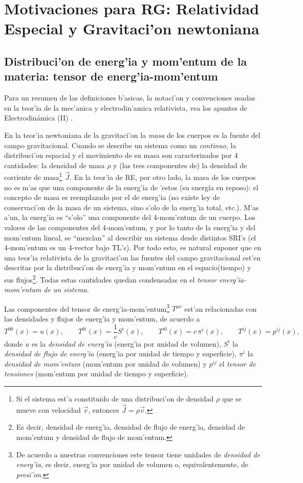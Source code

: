 \chapter{Motivaciones para RG: Relatividad Especial y Gravitaci'on newtoniana}
\section{Distribuci'on de energ'ia y mom'entum de la materia: tensor de energ'ia-mom'entum}

Para un resumen de las definiciones b'asicas, la notaci'on y convenciones usadas en la teor'ia de la mec'anica y electrodin'amica relativista, vea los apuntes de Electrodin\'amica (II) \cite{7}.

En la teor'ia newtoniana de la gravitaci'on la \textit{masa} de los cuerpos es la fuente del campo gravitacional. Cuando se describe un sistema como un \textit{continuo}, la distribuci'on espacial y el movimiento de su masa son caracterizados por 4 cantidades: la densidad de masa $\rho$ y (las tres componentes de) la densidad de corriente de masa\footnote{Si el sistema est'a constituido de una distribuci'on de densidad $\rho$ que se mueve con velocidad $\vec{v}$, entonces $\vec{J}=\rho\vec{v}$.} $\vec{J}$. En la teor'ia de RE, por otro lado, la masa de los cuerpos no es m'as que una componente de la energ'ia de 'estos (su energía en reposo): el concepto de masa es reemplazado por el de energ'ia (no existe ley de conservaci'on de la masa de un sistema, sino s'olo de la energ'ia total, etc.). M'as a'un, la energ'ia es ``s'olo'' una componente del 4-mom'entum de un cuerpo. Los valores de las componentes del 4-mom'entum, y por lo tanto de la energ'ia y del mom'entum lineal, se ``mezclan'' al describir un sistema desde distintos SRI's (el 4-mom'entum es un 4-vector bajo TL's). Por todo esto, es natural suponer que en una teor'ia relativista de la gravitaci'on las fuentes del campo gravitacional est'en descritas por la distribuci'on de energ'ia y mom'entum en el espacio(tiempo) y sus flujos\footnote{Es decir, densidad de energ'ia, densidad de flujo de energ'ia, densidad de mom'entum y densidad de flujo de mom'entum.}. Todas estas cantidades quedan condensadas en el \textit{tensor energ'ia-mom'entum de un sistema}.

Las componentes del tensor de energ'ia-mom'entum\footnote{De acuerdo a nuestras convenciones este tensor tiene unidades de \textit{densidad de energ'ia}, es decir, energ'ia por unidad de volumen o, equivalentemente, de \textit{presi'on}.} $T^{\mu\nu}$ est'an relacionadas con las densidades y flujos de energ'ia y mom'entum, de acuerdo a
\begin{equation}
 T^{00}(x)=u(x), \qquad T^{0i}(x)=\frac{1}{c}S^i(x), \qquad T^{i0}(x)=c\,\pi^i(x), \qquad T^{ij}(x)=p^{ij}(x),
\end{equation}
donde $u$ es la \textit{densidad de energ'ia} (energ'ia por unidad de volumen), $S^i$ la \textit{densidad de flujo de energ'ia} (energ'ia por unidad de tiempo y superficie), $\pi^i$ la \textit{densidad de mom'entum} (mom'entum por unidad de volumen) y $p^{ij}$ el \textit{tensor de tensiones} (mom'entum por unidad de tiempo y superficie).

